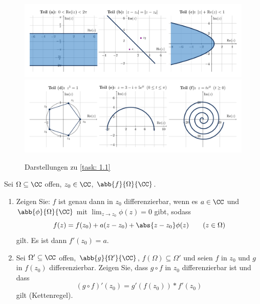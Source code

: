 \begin{exercisePage}
\begin{figure}
	\centering
	\includegraphics[width=\linewidth]{./fkt_uebungen-1-abb-abc.pdf}
	\includegraphics[width=\linewidth]{./fkt_uebungen-1-abb-def.pdf}
	\caption{Darstellungen zu \cref{task: 1.1}}
\end{figure}

\begin{task}
	Sei $\Omega \subseteq \CC$ offen, $z_0 \in \CC$, $\abb{f}{\Omega}{\CC}$.
	\begin{enumerate}[leftmargin=*, nolistsep, topsep=-\parskip]
		\item Zeigen Sie: $f$ ist genau dann in $z_0$ differenzierbar, wenn es $a \in \CC$ und $\abb{\phi}{\Omega}{\CC}$ mit $\lim_{z \to z_0} \phi(z) = 0$ gibt, sodass
		\begin{equation*}
			f(z) = f(z_0) + a (z-z_0) + \abs{z-z_0} \phi(z) \qquad (z \in \Omega)
		\end{equation*}
		gilt. Es ist dann $f'(z_0) = a$.
		\item Sei $\Omega' \subseteq \CC$ offen, $\abb{g}{\Omega'}{\CC}$, $f(\Omega) \subseteq \Omega'$ und seien $f$ in $z_0$ und $g$ in $f(z_0)$ differenzierbar. Zeigen Sie, dass $g \circ f$ in $z_0$ differenzierbar ist und dass
		\begin{equation*}
			(g \circ f)'(z_0) = g'(f(z_0)) * f'(z_0)
		\end{equation*}
		gilt (Kettenregel).
	\end{enumerate}
\end{task}

\pagebreak


\end{exercisePage}
